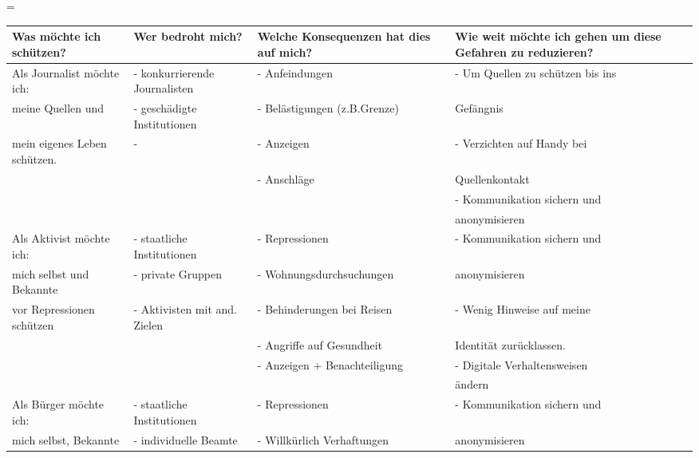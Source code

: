 \documentclass[landscape]{scrartcl}
\begin{document}
	
	\headwidth=\textheight
	
	
		\begin{tabular}{p{60mm}p{60mm}p{60mm}p{60mm}} 
			\toprule
			Was möchte ich schützen? & Wer bedroht mich? & Welche Konsequenzen hat dies auf mich?  & Wie weit möchte ich gehen um diese Gefahren zu reduzieren?   \\
			\midrule
			Als Journalist möchte ich:   		& - konkurrierende Journalisten 	& - Anfeindungen  							& - Um Quellen zu schützen bis ins  \\
			meine Quellen und 						& - geschädigte Institutionen   		& - Belästigungen (z.B.Grenze) & Gefängnis \\
			mein eigenes Leben schützen.  & -  														  & - Anzeigen  								  & - Verzichten auf Handy bei  \\
		 															    &  															& - Anschläge	& 								Quellenkontakt\\
		 															    &															&															& - Kommunikation sichern und \\
		 															    &															&		 													& anonymisieren \\
		 	\midrule
			Als Aktivist möchte ich: 		&	- staatliche Institutionen			&	- Repressionen 									 & - Kommunikation sichern und \\
			mich selbst und Bekannte	&	- private Gruppen						&	- Wohnungsdurchsuchungen		 & anonymisieren \\
			vor Repressionen schützen	&	- Aktivisten mit and. Zielen	&	- Behinderungen bei Reisen			& - Wenig Hinweise auf meine \\
																	&															&	- Angriffe auf Gesundheit 			  & Identität zurücklassen.\\
																	&															&	- Anzeigen	+ Benachteiligung     & - Digitale Verhaltensweisen  \\
																	&															&																	& ändern \\
			\midrule
			Als Bürger möchte ich:   			&	- staatliche Institutionen	    &	-	Repressionen				    	& - Kommunikation sichern und  \\
			mich selbst, Bekannte			   &   - individuelle Beamte			&	-	Willkürlich Verhaftungen   &    anonymisieren \\

\end{tabular}
\end{document}
